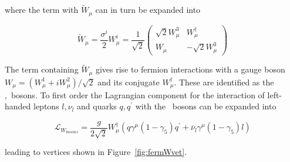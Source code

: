 where the term with $\widetilde{W}_\mu$ can in turn be expanded into 

\begin{equation}
\widetilde{W}_\mu = \frac{\sigma^i}{2}W^i_\mu = \frac{1}{\sqrt{2}}\begin{pmatrix} \sqrt{2}W_\mu^3 & W_\mu^\dagger \\ W_\mu & -\sqrt{2}W_\mu^3  \end{pmatrix}
\end{equation}

The term containing $\widetilde{W}_\mu$ gives rise to fermion interactions with a gauge 
boson $W_\mu = (W_\mu^1 + iW_\mu^2)/\sqrt{2}$ and its conjugate $W_\mu^\dagger$. 
These are identified as the \Wplus,\Wminus\ bosons.
To first order the Lagrangian component for the interaction of left-handed leptons
 $l,\nu_l$ and quarks $q,q^{'}$ with the \Wpm\ bosons can be expanded into 

\begin{equation}
\mathcal{L}_{W_{bosons}} = \frac{g}{2\sqrt{2}}W_\mu^\dagger\left ( q\gamma^\mu(1-\gamma_5)q^{'} + \overline{\nu}_l\gamma^\mu(1-\gamma_5)l  \right )
\end{equation} 

leading to vertices shown in Figure~\ref{fig:fermWvet}.

